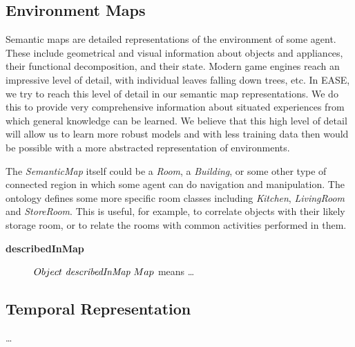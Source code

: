\subsection{Environment Maps}
Semantic maps are detailed representations of the environment of some agent.
These include geometrical and visual information about objects and appliances,
their functional decomposition, and their state.
Modern game engines reach an impressive level of detail, with individual
leaves falling down trees, etc.
In EASE, we try to reach this level of detail in our semantic map representations.
We do this to provide very comprehensive information about situated experiences
from which general knowledge can be learned.
We believe that this high level of detail will allow us to learn more robust
models and with less training data then would be possible with
a more abstracted representation of environments.

The \emph{SemanticMap} itself could be a \emph{Room}, a \emph{Building}, or some other type of connected
region in which some agent can do navigation and manipulation.
The ontology defines some more specific room classes including
\emph{Kitchen}, \emph{LivingRoom} and \emph{StoreRoom}.
This is useful, for example, to correlate objects with their likely storage room,
or to relate the rooms with common activities performed in them.

\begin{description}
\item[\textbf{describedInMap}]
$Object\ \emph{describedInMap}\ Map$ means \dots
\end{description}



\subsection{Temporal Representation}
\dots